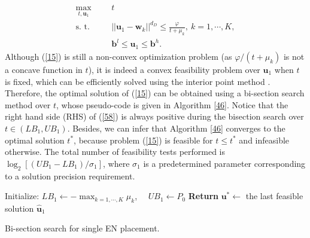 \documentclass[journal, draftcls, one column, 12pt]{IEEEtran}
\begin{document}
\begin{subequations}
\label{15}
   \begin{align}
    \underset{t,\mathbf{u}_1}{\text{max}}&  & &  t\\
    \text{s. t.}&     & &  ||\mathbf{u}_1 - \mathbf{w}_k||^{d_D} \leq \frac{\varphi}{t+ \mu_k},  \ k=1,\cdots,K, \label{58}\\
    & & & \mathbf{b}^l\leq \mathbf{u}_1\leq \mathbf{b}^h.
   \end{align}
\end{subequations}
Although (\ref{15}) is still a non-convex optimization problem (as $\varphi/(t+ \mu_k)$ is not a concave function in $t$), it is indeed a convex feasibility problem over $\mathbf{u}_1$ when $t$ is fixed, which can be efficiently solved using the interior point method \cite{2004:Boyd}. Therefore, the optimal solution of (\ref{15}) can be obtained using a bi-section search method over $t$, whose pseudo-code is given in Algorithm \ref{46}. Notice that the right hand side (RHS) of (\ref{58}) is always positive during the bisection search over $t \in\left(LB_1,UB_1\right)$. Besides, we can infer that Algorithm \ref{46} converges to the optimal solution $t^*$, because problem (\ref{15}) is feasible for $t\leq  t^*$ and infeasible otherwise. The total number of feasibility tests performed is $\log_2\left[\left(UB_1-LB_1\right)/\sigma_1\right]$, where $\sigma_1$ is a predetermined parameter corresponding to a solution precision requirement.

\begin{algorithm}
\footnotesize
 \SetAlgoLined
 Initialize: $LB_1\leftarrow - \max_{k=1,\cdots, K}\mu_k$, \ \ $UB_1\leftarrow P_0$\;
\textbf{Return} $\mathbf{u}^* \leftarrow$ the last feasible solution $\mathbf{\hat{u}}_1$\;
\caption{Bi-section search for single EN placement.}
\label{46}
\end{algorithm}
\end{document}
